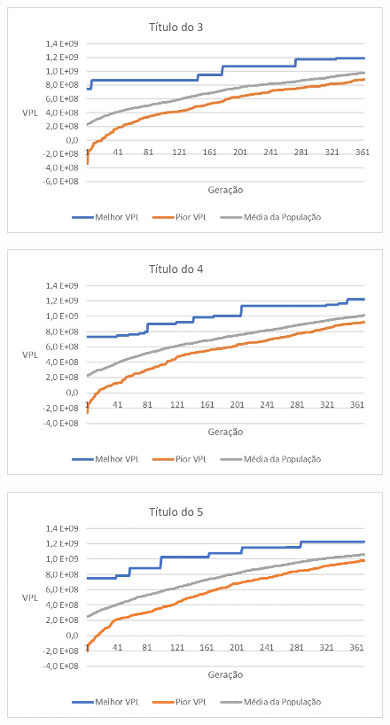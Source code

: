 \documentclass[12pt,a4paper]{report}
\begin{document}
\begin{figure}[H]
\centering

\includegraphics[scale=1]{3}

\end{figure}

\begin{figure}[H]
\centering

\includegraphics[scale=1]{4}

\end{figure}


\begin{figure}[H]
\centering

\includegraphics[scale=1]{5}

\end{figure}
\end{document}
